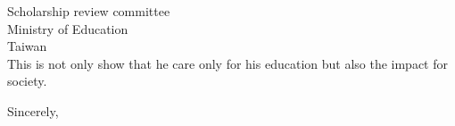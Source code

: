 \documentclass[12pt, a4paper]{simref} %
\begin{document}
\begin{letter}{
	Scholarship review committee\\
	Ministry of Education\\
	Taiwan\\
}
This is not only show that he care only for his education but also the impact for society.





\closing{Sincerely,}




\end{letter}
\end{document}

